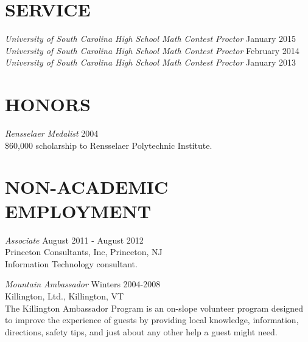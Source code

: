 \documentclass[line,overlapped]{res}
\begin{document}
\begin{resume}
 \section{SERVICE}
         {\sl University of South Carolina High School Math Contest Proctor} \hfill January 2015\\
         {\sl University of South Carolina High School Math Contest Proctor} \hfill February 2014\\
         {\sl University of South Carolina High School Math Contest Proctor} \hfill January 2013

 \section{HONORS}
         {\sl Rensselaer Medalist} \hfill 2004\\
         \$60,000 scholarship to Rensselaer Polytechnic Institute.

 \section{NON-ACADEMIC\\EMPLOYMENT}             
         {\sl Associate} \hfill August 2011 - August 2012\\
         Princeton Consultants, Inc, Princeton, NJ\\
         Information Technology consultant.

         {\it Mountain Ambassador} \hfill Winters 2004-2008\\
         Killington, Ltd., Killington, VT \\
         The Killington Ambassador Program is an on-slope volunteer program
         designed to improve the experience of guests by providing local knowledge, 
         information, directions, safety tips, and just about any other help a guest might need.


\end{resume}
\end{document}
